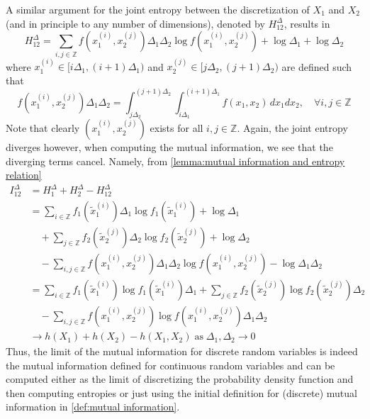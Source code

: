 \documentclass[../Thesis.tex]{subfiles}
\begin{document}
A similar argument for the joint entropy between the discretization of $X_1$ and $X_2$ (and in principle to any number of dimensions), denoted by $H^{\Delta}_{12}$, results in
$$H^{\Delta}_{12} = \sum_{i,j \in \mathbb{Z}} f\left(x_1^{(i)}, x_2^{(j)}\right) \Delta_1 \Delta_2 \log{f\left(x_1^{(i)}, x_2^{(j)}\right)} + \log{\Delta_1} + \log{\Delta_2}$$
where $x_1^{(i)}\in[i\Delta_1, (i+1)\Delta_1)$ and $x_2^{(j)}\in [j\Delta_2, (j+1)\Delta_2)$ are defined such that
$$f\left(x_1^{(i)}, x_2^{(j)}\right)\Delta_1 \Delta_2 = \int_{j\Delta_2}^{(j+1)\Delta_2}\int_{i\Delta_1}^{(i+1)\Delta_1} f(x_1,x_2) \, dx_1 dx_2,\quad \forall i,j\in\mathbb{Z}$$
Note that clearly $\left(x_1^{(i)},x_2^{(j)}\right)$ exists for all $i,j\in \mathbb{Z}$. Again, the joint entropy diverges however, when computing the mutual information, we see that the diverging terms cancel. Namely, from \autoref{lemma:mutual information and entropy relation}
\begin{align*}
    I^{\Delta}_{12} & = H^{\Delta}_1 + H^{\Delta}_2 - H^{\Delta}_{12}                                                                                                                                                                     \\
                    & = \sum_{i\in\mathbb{Z}} f_1\left(\tilde{x}_1^{(i)}\right) \Delta_1 \log{f_1\left(\tilde{x}_1^{(i)}\right)} + \log{\Delta_1}                                                                                         \\
                    & \quad + \sum_{j\in\mathbb{Z}} f_2\left(\tilde{x}_2^{(j)}\right) \Delta_2 \log{f_2\left(\tilde{x}_2^{(j)}\right)} + \log{\Delta_2}                                                                                   \\
                    & \quad - \sum_{i,j\in\mathbb{Z}} f\left(x_1^{(i)},x_2^{(j)}\right) \Delta_1 \Delta_2 \log{f\left(x_1^{(i)},x_2^{(j)}\right)} - \log{\Delta_1 \Delta_2}                                                               \\
                    & =\sum_{i\in\mathbb{Z}} f_1\left(\tilde{x}_1^{(i)}\right) \log{f_1\left(\tilde{x}_1^{(i)}\right)}\Delta_1 + \sum_{j\in\mathbb{Z}} f_2\left(\tilde{x}_2^{(j)}\right)  \log{f_2\left(\tilde{x}_2^{(j)}\right)}\Delta_2 \\
                    & \quad -\sum_{i,j\in\mathbb{Z}} f\left(x_1^{(i)},x_2^{(j)}\right) \log{f\left(x_1^{(i)},x_2^{(j)}\right)} \Delta_1 \Delta_2                                                                                          \\
                    & \to h(X_1) + h(X_2) - h(X_1,X_2)\; \text{as}\; \Delta_1,\Delta_2 \to 0
\end{align*}
Thus, the limit of the mutual information for discrete random variables is indeed the mutual information defined for continuous random variables and can be computed either as the limit of discretizing the probability density function and then computing entropies or just using the initial definition for (discrete) mutual information in \autoref{def:mutual information}.
\end{document}
